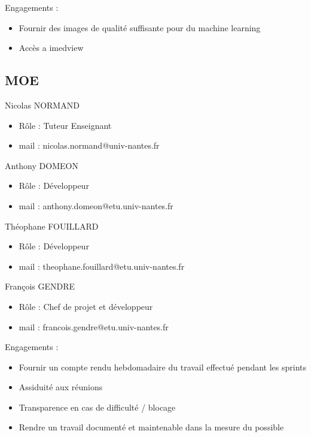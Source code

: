 \documentclass[a4paper, 11pt]{report}
\begin{document}
 
 Engagements :
 \begin{itemize}
\item Fournir des images de qualité suffisante pour du machine learning
\item Accès a imedview
 \end{itemize}

\subsection*{MOE}
Nicolas NORMAND

\begin{itemize}
\item Rôle : Tuteur Enseignant
\item mail : nicolas.normand@univ-nantes.fr
 \end{itemize}
Anthony DOMEON

\begin{itemize}
\item Rôle : Développeur
\item mail : anthony.domeon@etu.univ-nantes.fr
\end{itemize}
Théophane FOUILLARD

\begin{itemize}
\item Rôle : Développeur
\item mail : theophane.fouillard@etu.univ-nantes.fr
\end{itemize}
François GENDRE

\begin{itemize}
\item Rôle : Chef de projet et développeur
\item mail : francois.gendre@etu.univ-nantes.fr
\end{itemize}
Engagements :

\begin{itemize}
	\item Fournir un compte rendu hebdomadaire du travail effectué pendant les sprints
	\item Assiduité aux réunions
	\item Transparence en cas de difficulté / blocage
	\item Rendre un travail documenté et maintenable dans la mesure du possible

\end{itemize}
\end{document}
